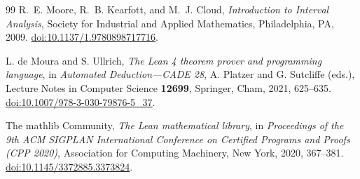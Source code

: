 \documentclass[11pt]{article}
\theoremstyle{definition}
\theoremstyle{remark}
\begin{document}
\begin{thebibliography}{99}
R.~E. Moore, R.~B. Kearfott, and M.~J. Cloud,
\emph{Introduction to Interval Analysis},
Society for Industrial and Applied Mathematics, Philadelphia, PA, 2009.
\href{https://doi.org/10.1137/1.9780898717716}{doi:10.1137/1.9780898717716}.


L. de Moura and S. Ullrich,
\emph{The Lean 4 theorem prover and programming language},
in \emph{Automated Deduction---CADE 28},
A. Platzer and G. Sutcliffe (eds.),
Lecture Notes in Computer Science \textbf{12699},
Springer, Cham, 2021, 625--635.
\href{https://doi.org/10.1007/978-3-030-79876-5_37}{doi:10.1007/978-3-030-79876-5\_37}.


The mathlib Community,
\emph{The Lean mathematical library},
in \emph{Proceedings of the 9th ACM SIGPLAN International Conference on
Certified Programs and Proofs (CPP 2020)},
Association for Computing Machinery, New York, 2020, 367--381.
\href{https://doi.org/10.1145/3372885.3373824}{doi:10.1145/3372885.3373824}.

\end{thebibliography}
\end{document}
